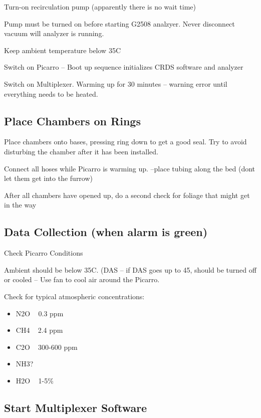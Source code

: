 \documentclass[12pt]{../SOP3}\usepackage[]{graphicx}\usepackage[]{color}
\begin{document}
\NP Turn-on recirculation pump (apparently there is no wait time)

\NP Pump must be turned on before starting G2508 analzyer. Never disconnect vacuum will analyzer is running.

\NP Keep ambient temperature below 35\degree C

\NP Switch on Picarro  -- Boot up sequence initializes CRDS software and analyzer

\NP Switch on Multiplexer. Warming up for 30 minutes -- warning error until everything needs to be heated.

\subsection*{Place Chambers on Rings}

\NP Place chambers onto bases, pressing ring down to get a good seal. Try to avoid disturbing the chamber after it has been installed. 

\NP Connect all hoses while Picarro is warming up. --place tubing along the bed (dont let them get into the furrow)

\NP After all chambers have opened up, do a second check for foliage that might get in the way

\subsection*{Data Collection (when alarm is green)}

\NP Check Picarro Conditions

\NP Ambient should be below 35\degree C. (DAS -- if DAS goes up to 45\degree, should be turned off or cooled -- Use fan to cool air around the Picarro.
                               
\NP Check for typical atmospheric concentrations:
                                 
\begin{itemize}
\item N2O ~ 0.3 ppm
\item CH4 ~ 2.4 ppm
\item C2O ~ 300-600 ppm
\item NH3?
\item H2O ~ 1-5\%
\end{itemize}
                               
\subsection*{Start Multiplexer Software}
\end{document}
